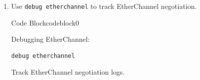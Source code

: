 \documentclass[a4paper]{article}
\begin{document}
\begin{enumerate}
\begin{ocg}{Code Block}{codeblock}{0}
		      \vspace{0.5cm}
	      \end{ocg}


	\item Use \texttt{debug etherchannel} to track EtherChannel negotiation.


	      \begin{ocg}{Code Block}{codeblock}{0}

		      \vspace{0.5cm}

		      Debugging EtherChannel:
		      \begin{lstlisting}
debug etherchannel
        \end{lstlisting}


		      \begin{tcolorbox}
			      Track EtherChannel negotiation logs.
		      \end{tcolorbox}


		      \vspace{0.5cm}
	      \end{ocg}


\end{enumerate}
\end{document}
